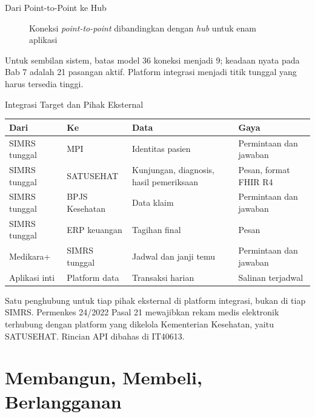 \documentclass[aspectratio=169, table, 12pt]{beamer}
\begin{document}
\begin{frame}{{\Large Dari Point-to-Point ke Hub}}
  \centering
  \begin{figure}
    \resizebox{0.68\textwidth}{!}{}
    \caption{Koneksi \textit{point-to-point} dibandingkan dengan \textit{hub} untuk enam aplikasi}
  \end{figure}
  \vspace{-4pt}
  \small Untuk sembilan sistem, batas model 36 koneksi menjadi 9; keadaan nyata pada Bab 7 adalah 21
  pasangan aktif. Platform integrasi menjadi titik tunggal yang harus tersedia tinggi.
\end{frame}

\begin{frame}{{\Large Integrasi Target dan Pihak Eksternal}}
  \scriptsize
  \begin{tabularx}{\textwidth}{L{2.2cm}L{2.2cm}YL{3.2cm}}
    \hline
    \textbf{Dari} & \textbf{Ke} & \textbf{Data} & \textbf{Gaya} \\
    \hline
    SIMRS tunggal & MPI & Identitas pasien & Permintaan dan jawaban \\
    \hline
    SIMRS tunggal & SATUSEHAT & Kunjungan, diagnosis, hasil pemeriksaan & Pesan, format FHIR R4 \\
    \hline
    SIMRS tunggal & BPJS Kesehatan & Data klaim & Permintaan dan jawaban \\
    \hline
    SIMRS tunggal & ERP keuangan & Tagihan final & Pesan \\
    \hline
    Medikara+ & SIMRS tunggal & Jadwal dan janji temu & Permintaan dan jawaban \\
    \hline
    Aplikasi inti & Platform data & Transaksi harian & Salinan terjadwal \\
    \hline
  \end{tabularx}

  \vspace{6pt}
  \small Satu penghubung untuk tiap pihak eksternal di platform integrasi, bukan di tiap SIMRS.
  Permenkes 24/2022 Pasal 21 mewajibkan rekam medis elektronik terhubung dengan platform yang dikelola
  Kementerian Kesehatan, yaitu SATUSEHAT. Rincian API dibahas di IT40613.
\end{frame}

\section{Membangun, Membeli, Berlangganan}
\end{document}
